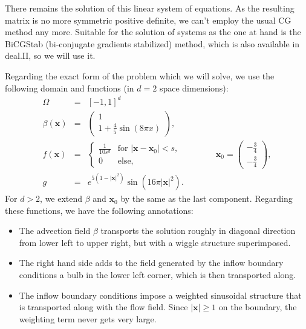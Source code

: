 \documentclass{article}
\renewcommand{\vec}[1]{{\mathbf #1}}
\begin{document}
There remains the solution of this linear system of equations. As the
resulting matrix is no more symmetric positive definite, we can't
employ the usual CG method any more. Suitable for the solution of
systems as the one at hand is the BiCGStab (bi-conjugate gradients
stabilized) method, which is also available in deal.II, so we will use
it.


Regarding the exact form of the problem which we will solve, we use
the following domain and functions (in $d=2$ space dimensions):
\begin{eqnarray*}
  \Omega &=& [-1,1]^d \\
  \beta(\vec x) 
  &=&
  \left(
    \begin{array}{c}1 \\ 1+\frac 45 \sin(8\pi x)\end{array} 
  \right),
  \\
  f(\vec x)
  &=&
  \left\{
    \begin{array}{ll}
        \frac 1{10 s^d} & 
        \text{for $|\vec x-\vec x_0|<s$}, \\
        0 & \text{else},
    \end{array}
  \right.
  \qquad\qquad
  \vec x_0 
  =
  \left(
    \begin{array}{c} -\frac 34 \\ -\frac 34\end{array}
  \right),
  \\
  g
  &=&
  e^{5(1-|\vec x|^2)} \sin(16\pi|\vec x|^2).
\end{eqnarray*}
For $d>2$, we extend $\beta$ and $\vec x_0$ by the same as the last
component. Regarding these functions, we have the following
annotations:
\begin{itemize}
\item The advection field $\beta$ transports the solution roughly in
diagonal direction from lower left to upper right, but with a wiggle
structure superimposed.
\item The right hand side adds to the field generated by the inflow
boundary conditions a bulb in the lower left corner, which is then
transported along.
\item The inflow boundary conditions impose a weighted sinusoidal
structure that is transported along with the flow field. Since $|\vec
x|\ge 1$ on the boundary, the weighting term never gets very large.
\end{itemize}
\end{document}
